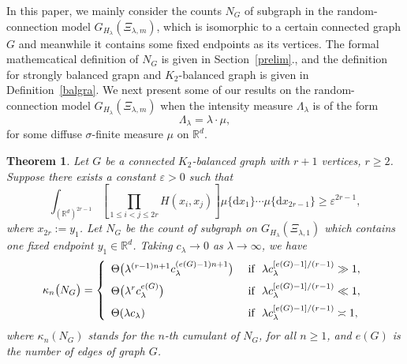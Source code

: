 \documentclass[12pt]{article}
\newcommand{\R}{\mathbb{R}}
\newtheorem{thm}[prop]{Theorem}
\numberwithin{equation}{section}
\begin{document}
In this paper, we mainly consider the counts $N_G$ of subgraph in the random-connection model $G_{H_\lambda}(\Xi_{\lambda,m})$, which is isomorphic to a certain connected graph $G$ and meanwhile it contains some fixed endpoints as its vertices. The formal mathemcatical definition of $N_G$ is given in Section~\ref{prelim}., and the definition for strongly balanced grapn and $K_2$-balanced graph is given in Definition~\ref{balgra}. We next present some of our results on the random-connection model $G_{H_\lambda}(\Xi_{\lambda,m})$ when the intensity measure $\Lambda_\lambda$ is of the form $$\Lambda_\lambda=\lambda\cdot\mu,$$
for some diffuse $\sigma$-finite measure $\mu$ on $\R^d$. 


\begin{thm}\label{thm-1}
  Let $G$ be a connected $K_2$-balanced graph with $r+1$ vertices, $r\ge2$. Suppose there exists a constant $\varepsilon>0$ such that 
  \begin{equation}
    \int_{(\R^d)^{2r-1}}\left[\prod_{1\le i<j\le 2r}H(x_i,x_j)\right]\mu\{\mathrm{d}x_1\}\cdots\mu\{\mathrm{d}x_{2r-1}\}\ge \varepsilon^{2r-1},
  \end{equation}
  where $x_{2r}:=y_1$. Let $N_G$ be the count of subgraph on $G_{H_\lambda}(\Xi_{\lambda,1})$ which contains one fixed endpoint $y_1\in\R^d$. Taking $c_\lambda\to0$ as $\lambda\to\infty$, we have
  \begin{eqnarray}
    \kappa_n\big(N_G\big)=\left\{\begin{array}{ll}
      \Theta\big(\lambda^{(r-1)n+1} c_\lambda^{(e(G)-1)n+1}\big) & \ \mbox{if }\ \lambda c_\lambda^{[e(G)-1]/(r-1)}\gg1,
      \medskip
      \\
      \displaystyle
\Theta\big(\lambda^{r}c_\lambda^{e(G)}\big) & \ \mbox{if }\ \lambda c_\lambda^{[e(G)-1]/(r-1)}\ll1,
    \medskip
    \\
    \displaystyle
    \Theta(\lambda c_\lambda) & \ \mbox{if }\ \lambda c_\lambda^{[e(G)-1]/(r-1)}\asymp1,
    \end{array}
    \right.
  \end{eqnarray}
  where $\kappa_n(N_G)$ stands for the $n$-th cumulant of $N_G$, for all $n\ge 1$, and $e(G)$ is the number of edges of graph $G$.
\end{thm}
\end{document}
